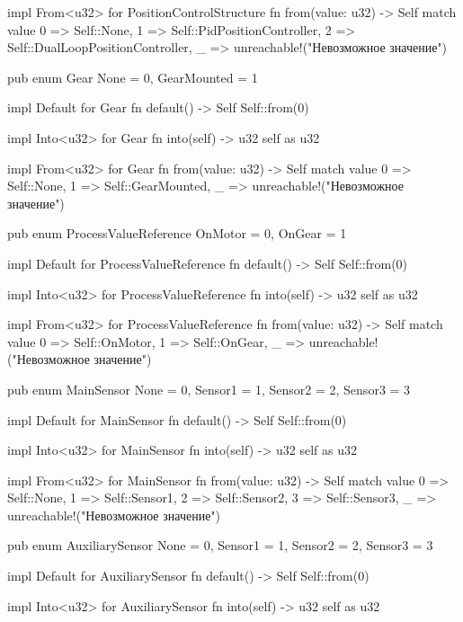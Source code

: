 \documentclass[a4paper,12pt]{article}
\begin{document}
\begin{appendices}
\begin{flushleft}
\begin{MyCodes}
impl From<u32> for PositionControlStructure {
    fn from(value: u32) -> Self {
        match value {
            0 => Self::None,
            1 => Self::PidPositionController,
            2 => Self::DualLoopPositionController,
            _ => unreachable!("Невозможное значение")
        }
    }
}

pub enum Gear {
    None = 0,
    GearMounted = 1
}

impl Default for Gear {
    fn default() -> Self {
        Self::from(0)
    }
}

impl Into<u32> for Gear {
    fn into(self) -> u32 {
        self as u32
    }
}

impl From<u32> for Gear {
    fn from(value: u32) -> Self {
        match value {
            0 => Self::None,
            1 => Self::GearMounted,
            _ => unreachable!("Невозможное значение")
        }
    }
}

pub enum ProcessValueReference {
    OnMotor = 0,
    OnGear = 1
}

impl Default for ProcessValueReference {
    fn default() -> Self {
        Self::from(0)
    }
}

impl Into<u32> for ProcessValueReference {
    fn into(self) -> u32 {
        self as u32
    }
}

impl From<u32> for ProcessValueReference {
    fn from(value: u32) -> Self {
        match value {
            0 => Self::OnMotor,
            1 => Self::OnGear,
            _ => unreachable!("Невозможное значение")
        }
    }
}

pub enum MainSensor {
    None = 0,
    Sensor1 = 1,
    Sensor2 = 2,
    Sensor3 = 3
}

impl Default for MainSensor {
    fn default() -> Self {
        Self::from(0)
    }
}

impl Into<u32> for MainSensor {
    fn into(self) -> u32 {
        self as u32
    }
}

impl From<u32> for MainSensor {
    fn from(value: u32) -> Self {
        match value {
            0 => Self::None,
            1 => Self::Sensor1,
            2 => Self::Sensor2,
            3 => Self::Sensor3,
            _ => unreachable!("Невозможное значение")
        }
    }
}

pub enum AuxiliarySensor {
    None = 0,
    Sensor1 = 1,
    Sensor2 = 2,
    Sensor3 = 3
}

impl Default for AuxiliarySensor {
    fn default() -> Self {
        Self::from(0)
    }
}

impl Into<u32> for AuxiliarySensor {
    fn into(self) -> u32 {
        self as u32
    }
}


\end{MyCodes}
\end{flushleft}
\end{appendices}
\end{document}
